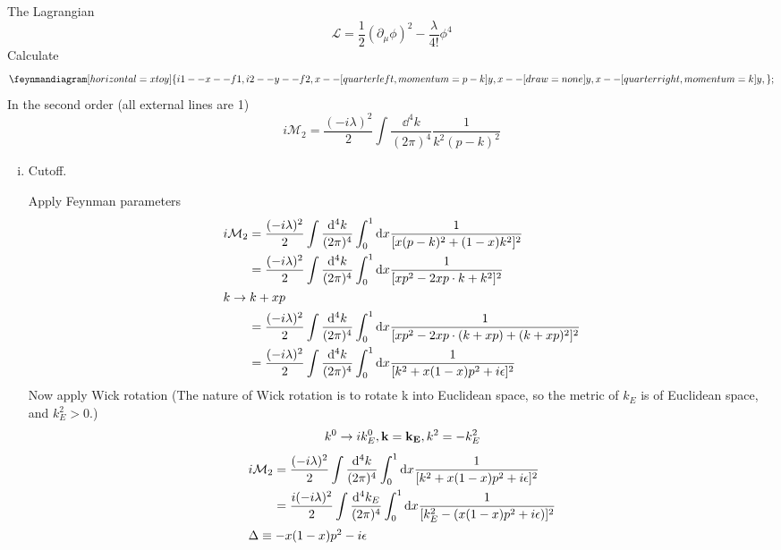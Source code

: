 \documentclass{article}
\begin{document}
The Lagrangian
$$\mathcal{L}=\frac{1}{2}(\partial_{\mu}\phi)^2-\frac{\lambda}{4!}\phi^4$$
Calculate
$$\feynmandiagram[horizontal=x to y]{
i1--x--f1,
i2--y--f2,
x--[quarter left,momentum=p-k]y,
x--[draw=none]y,
x--[quarter right,momentum=k]y,
};$$
In the second order (all external lines are 1)
$$i\mathcal{M}_2=\frac{(-i\lambda)^2}{2}\int\frac{\dd^4k}{(2\pi)^4}\frac{1}{k^2(p-k)^2}$$
\begin{enumerate}[(i)]
  \item Cutoff.

  Apply Feynman parameters
  \begin{align*}
    i\mathcal{M}_2&=\frac{(-i\lambda)^2}{2}\int\frac{\dd^4k}{(2\pi)^4}\int^1_0\dd x\frac{1}{[x(p-k)^2+(1-x)k^2]^2}\\
    &=\frac{(-i\lambda)^2}{2}\int\frac{\dd^4k}{(2\pi)^4}\int^1_0\dd x\frac{1}{[xp^2-2xp\cdot k+k^2]^2}\\\intertext{$k\rightarrow k+xp$}
    &=\frac{(-i\lambda)^2}{2}\int\frac{\dd^4k}{(2\pi)^4}\int^1_0\dd x\frac{1}{[xp^2-2xp\cdot (k+xp)+(k+xp)^2]^2}\\
    &=\frac{(-i\lambda)^2}{2}\int\frac{\dd^4k}{(2\pi)^4}\int^1_0\dd x\frac{1}{[k^2+x(1-x)p^2+i\epsilon]^2}
  \end{align*}
  Now apply Wick rotation (The nature of Wick rotation is to rotate k into Euclidean space, so the metric of $k_E$ is of Euclidean space, and $k_E^2>0$.)
  $$k^0\rightarrow ik^0_E,\vb{k}=\vb{k_E},k^2=-k^2_E$$
  \begin{align*}
    i\mathcal{M}_2&=\frac{(-i\lambda)^2}{2}\int\frac{\dd^4k}{(2\pi)^4}\int^1_0\dd x\frac{1}{[k^2+x(1-x)p^2+i\epsilon]^2}\\
    &=\frac{i(-i\lambda)^2}{2}\int\frac{\dd^4k_E}{(2\pi)^4}\int^1_0\dd x\frac{1}{[k_E^2-(x(1-x)p^2+i\epsilon)]^2}\\\intertext{$\Delta\equiv-x(1-x)p^2-i\epsilon$}

\end{align*}
\end{enumerate}
\end{document}
